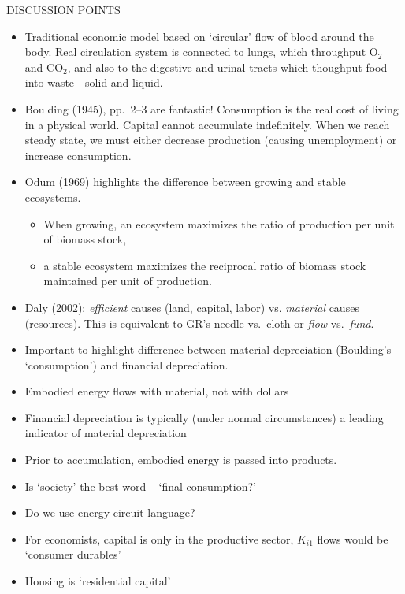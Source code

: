 DISCUSSION POINTS
\begin{itemize}
	\item{Traditional economic model based on `circular' flow of blood around the body. 
	Real circulation system is connected to lungs, which throughput O$_2$ and CO$_2$, 
	and also to the digestive and urinal tracts which thoughput food into waste---solid and liquid.}
	\item{Boulding (1945)\cite{Boulding1945}, pp.\ 2--3 are fantastic! Consumption is the real cost of living in a physical
	world. Capital cannot accumulate indefinitely.
	When we reach steady state, we must either decrease production (causing unemployment)
	or increase consumption.}
	\item{Odum (1969)\cite{Odum1969} highlights the difference between growing and stable ecosystems.}
		\begin{itemize}
			\item{When growing, an ecosystem maximizes the ratio of production per unit 
			of biomass stock,}
			\item{a stable ecosystem maximizes the reciprocal ratio of biomass stock 
			maintained per unit of production.}
		\end{itemize}
	\item{Daly (2002)\cite{Daly2002}: \emph{efficient} causes (land, capital, labor) vs. \emph{material} causes (resources).
	This is equivalent to GR's needle vs.\ cloth or \emph{flow} vs.\ \emph{fund}.}
	\item{Important to highlight difference between material depreciation (Boulding's `consumption') and financial depreciation.}
	\item{Embodied energy flows with material, not with dollars}
	\item{Financial depreciation is typically (under normal circumstances) a leading indicator of material depreciation}
	\item{Prior to accumulation, embodied energy is passed into products.}
	\item{Is `society' the best word – `final consumption?'}
	\item{Do we use energy circuit language?}
	\item{For economists, capital is only in the productive sector, $\dot{K}_{i1}$ flows would be `consumer durables'}
	\item{Housing is `residential capital'}
\end{itemize}

\cite{Daniels2001,Hoekstra2003}

